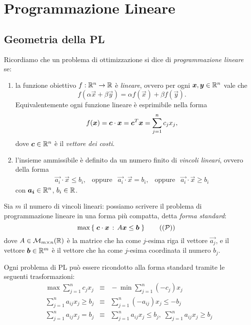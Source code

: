 \chapter{Programmazione Lineare}

\section{Geometria della PL}

Ricordiamo che un problema di ottimizzazione si dice di \emph{programmazione lineare} se:
\begin{enumerate}[label={(\arabic*)}]
    \item la funzione obiettivo $f : \mathbb{R}^n \to \mathbb{R}$ è \emph{lineare}, ovvero per ogni $\bm{x}, \bm{y} \in \mathbb{R}^n$ vale che \[
        f(\alpha\vec x + \beta\vec y) = \alpha f(\vec x) + \beta f(\vec y).
    \] Equivalentemente ogni funzione lineare è esprimibile nella forma \[
        f(\bm{x}) = \bm{c} \cdot \bm{x} = {\bm{c}}^T\bm{x} = \sum_{j = 1}^n c_jx_j,    
    \] dove $\bm{c} \in \mathbb{R}^n$ è il \emph{vettore dei costi}.
    \item l'insieme ammissibile è definito da un numero finito di \emph{vincoli lineari}, ovvero della forma \begin{align*}
        \vec{a_i} \cdot \vec x \leq b_i, &\text{oppure} &\vec{a_i} \cdot \vec x = b_i, &\text{oppure} &\vec{a_i} \cdot \vec x \geq b_i    
    \end{align*} con $\bm{a_i} \in \mathbb{R}^n$, $b_i \in \mathbb{R}$. 
\end{enumerate}

Sia $m$ il numero di vincoli lineari: possiamo scrivere il problema di programmazione lineare in una forma più compatta, detta \emph{forma standard}: \begin{equation}
    \max \set{\vec c \cdot \vec x \suchthat A\vec x \leq \vec b} \tag{($\PP$)}
\end{equation} dove $A \in \mathcal{M}_{m \times n}(\mathbb{R})$ è la matrice che ha come $j$-esima riga il vettore $\vec{a_j}$, e il vettore $\bm{b} \in \mathbb{R}^m$ è il vettore che ha come $j$-esima coordinata il numero $b_j$.

Ogni problema di PL può essere ricondotto alla forma standard tramite le seguenti trasformazioni:
\begin{align*}
    &\max \sum_{j = 1}^n c_jx_j &\equiv &{}-\min \sum_{j = 1}^n (-c_j)x_j \\
    &\sum_{j = 1}^n a_{ij}x_j \geq b_j &\equiv &{}\sum_{j = 1}^n (-a_{ij})x_j \leq -b_j\\
    &\sum_{j = 1}^n a_{ij}x_j = b_j &\equiv &{} \sum_{j = 1}^n a_{ij}x_j \leq b_j, \; \sum_{j = 1}^n a_{ij}x_j \geq b_j  
\end{align*}


